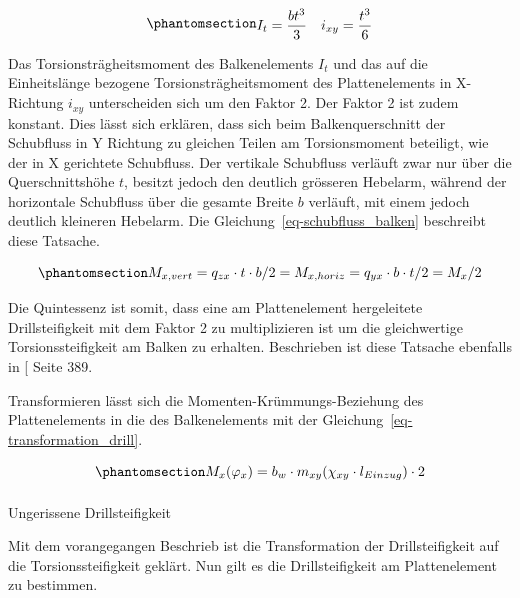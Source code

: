 \documentclass[
  11pt,
  letterpaper,
]{scrreprt}
\makeatletter
\let\oldparagraph\paragraph
\renewcommand{\paragraph}{
    \@ifstar
      \xxxParagraphStar
      \xxxParagraphNoStar
  }
\newcommand{\xxxParagraphStar}[1]{\oldparagraph*{#1}\mbox{}}
\newcommand{\xxxParagraphNoStar}[1]{\oldparagraph{#1}\mbox{}}
\makeatother
\begin{document}
\begin{equation}\phantomsection\label{eq-torsion_streifen}{
\begin{aligned}
I_t = \frac{bt^3}{3} \quad 
i_{xy} = \frac{t^3}{6}
\end{aligned}
}\end{equation}

Das Torsionsträgheitsmoment des Balkenelements \(I_t\) und das auf die
Einheitslänge bezogene Torsionsträgheitsmoment des Plattenelements in
X-Richtung \(i_{xy}\) unterscheiden sich um den Faktor 2. Der Faktor 2
ist zudem konstant. Dies lässt sich erklären, dass sich beim
Balkenquerschnitt der Schubfluss in Y Richtung zu gleichen Teilen am
Torsionsmoment beteiligt, wie der in X gerichtete Schubfluss. Der
vertikale Schubfluss verläuft zwar nur über die Querschnittshöhe \(t\),
besitzt jedoch den deutlich grösseren Hebelarm, während der horizontale
Schubfluss über die gesamte Breite \(b\) verläuft, mit einem jedoch
deutlich kleineren Hebelarm. Die Gleichung~\ref{eq-schubfluss_balken}
beschreibt diese Tatsache.

\begin{equation}\phantomsection\label{eq-schubfluss_balken}{
M_{x,vert} = q_{zx} \cdot t \cdot b/2 = M_{x,horiz} = q_{yx} \cdot b \cdot t/2 = M_x / 2
}\end{equation}

Die Quintessenz ist somit, dass eine am Plattenelement hergeleitete
Drillsteifigkeit mit dem Faktor 2 zu multiplizieren ist um die
gleichwertige Torsionssteifigkeit am Balken zu erhalten. Beschrieben ist
diese Tatsache ebenfalls in
{[}\citeproc{ref-blaauwendraad_plates_2010}{1}{]} Seite 389.

Transformieren lässt sich die Momenten-Krümmungs-Beziehung des
Plattenelements in die des Balkenelements mit der
Gleichung~\ref{eq-transformation_drill}.

\begin{equation}\phantomsection\label{eq-transformation_drill}{
M_x(\varphi_x) = b_w \cdot m_{xy}(\chi_{xy}\cdot l_{Einzug}) \cdot 2
}\end{equation}

\paragraph{Ungerissene
Drillsteifigkeit}\label{ungerissene-drillsteifigkeit}

Mit dem vorangegangen Beschrieb ist die Transformation der
Drillsteifigkeit auf die Torsionssteifigkeit geklärt. Nun gilt es die
Drillsteifigkeit am Plattenelement zu bestimmen.
\end{document}
